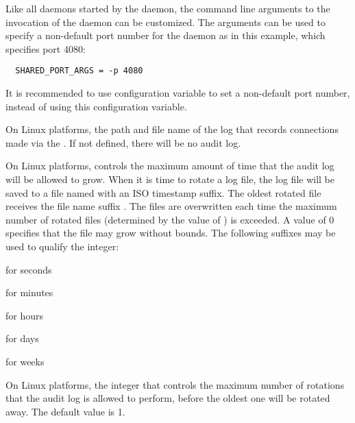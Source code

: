 \begin{description}
\label{param:SharedPortArgs}
\item[\Macro{SHARED\_PORT\_ARGS}] Like all daemons started by the
   daemon, the command line arguments to the invocation
  of the  daemon can be customized.
  The arguments can be used to specify a non-default port number for the
   daemon as in this example, which specifies port 4080:

\begin{verbatim}
  SHARED_PORT_ARGS = -p 4080
\end{verbatim}
  It is recommended to use configuration variable 
   to set a non-default port number,
  instead of using this configuration variable.

\label{param:SharedPortAuditLog}
\item[\Macro{SHARED\_PORT\_AUDIT\_LOG}]
  On Linux platforms,
  the path and file name of the  log that records
  connections made via the .
  If not defined, there will be no  audit log.

\label{param:MaxSharedPortAuditLog}
\item[\Macro{MAX\_SHARED\_PORT\_AUDIT\_LOG}]
  On Linux platforms,
  controls the maximum amount of time that the 
  audit log will be allowed to grow.
  When it is time to rotate a log file,
  the log file will be saved to a file named with an ISO timestamp suffix.
  The oldest rotated file receives the file name suffix .
  The  files are overwritten each time the maximum number of
  rotated files
  (determined by the value of )
  is exceeded.
  A value of 0 specifies that the file may grow without bounds.
  The following suffixes may be used to qualify the integer:
\begin{description}
  \item{ for seconds}
  \item{ for minutes}
  \item{ for hours}
  \item{ for days}
  \item{ for weeks}
\end{description}

\label{param:MaxNumSharedPortAuditLog}
\item[\Macro{MAX\_NUM\_SHARED\_PORT\_AUDIT\_LOG}]
  On Linux platforms,
  the integer that controls the maximum number of rotations that
  the  audit log is allowed to perform,
  before the oldest one will be rotated away.
  The default value is 1.

\end{description}

